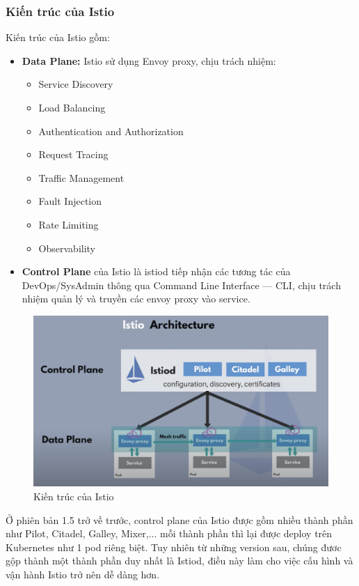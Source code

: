 \documentclass[12pt,a4paper]{report}
\begin{document}
			\subsubsection{Kiến trúc của Istio}
		\hspace{0.6cm}Kiến trúc của Istio gồm:
		\begin{itemize}
			\item \textbf{Data Plane:} Istio sử dụng Envoy proxy, chịu trách nhiệm:
			\begin{itemize}
				\item Service Discovery
				\item Load Balancing
				\item Authentication and Authorization
				\item Request Tracing
				\item Traffic Management
				\item Fault Injection
				\item Rate Limiting
				\item Observability
			\end{itemize}
			\item \textbf{Control Plane} của Istio là istiod tiếp nhận các tương tác của DevOps/SysAdmin thông qua Command Line Interface — CLI, chịu trách nhiệm quản lý và truyền các envoy proxy vào service.
		\end{itemize}
		\begin{figure}[h]
			\centering
			\includegraphics[width=0.7\linewidth]{Pics/2.1.2-p1}
			\caption{Kiến trúc của Istio}
			\label{fig:2.1.2-1}
		\end{figure}
		
		Ở phiên bản 1.5 trở về trước, control plane của Istio được gồm nhiều thành phần như Pilot, Citadel, Galley, Mixer,... mỗi thành phần thì lại được deploy trên Kubernetes như 1 pod riêng biệt. Tuy nhiên từ những version sau, chúng đươc gộp thành một thành phần duy nhất là Istiod, điều này làm cho việc cấu hình và vận hành Istio trở nên dễ dàng hơn.
		
\end{document}
